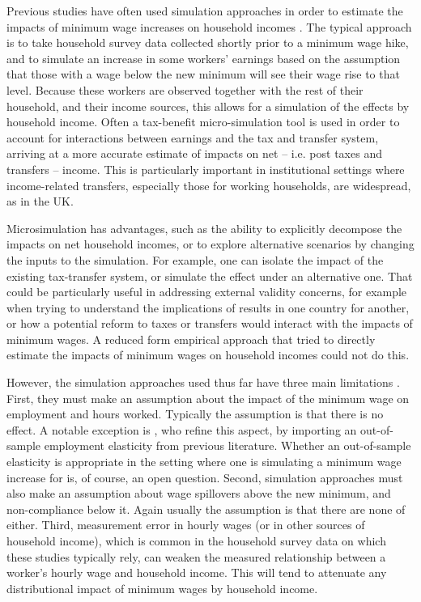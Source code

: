 Previous studies have often used simulation approaches in order to estimate the impacts of minimum wage increases on household incomes \citep{Brewer2017,Sabia2010}. The typical approach is to take household survey data collected shortly prior to a minimum wage hike, and to simulate an increase in some workers' earnings based on the assumption that those with a wage below the new minimum will see their wage rise to that level. Because these workers are observed together with the rest of their household, and their income sources, this allows for a simulation of the effects by household income. Often a tax-benefit micro-simulation tool is used in order to account for interactions between earnings and the tax and transfer system, arriving at a more accurate estimate of impacts on net -- i.e. post taxes and transfers -- income. This is particularly important in institutional settings where income-related transfers, especially those for working households, are widespread, as in the UK.

Microsimulation has advantages, such as the ability to explicitly decompose the impacts on net household incomes, or to explore alternative scenarios by changing the inputs to the simulation. For example, one can isolate the impact of the existing tax-transfer system, or simulate the effect under an alternative one. That could be particularly useful in addressing external validity concerns, for example when trying to understand the implications of results in one country for another, or how a potential reform to taxes or transfers would interact with the impacts of minimum wages. A reduced form empirical approach that tried to directly estimate the impacts of minimum wages on household incomes could not do this.

However, the simulation approaches used thus far have three main limitations \citep{Dube2019}. First, they must make an assumption about the impact of the minimum wage on employment and hours worked. Typically the assumption is that there is no effect. A notable exception is \cite{Sabia2010}, who refine this aspect, by importing an out-of-sample employment elasticity from previous literature. Whether an out-of-sample elasticity is appropriate in the setting where one is simulating a minimum wage increase for is, of course, an open question. Second, simulation approaches must also make an assumption about wage spillovers above the new minimum, and non-compliance below it. Again usually the assumption is that there are none of either. Third, measurement error in hourly wages (or in other sources of household income), which is common in the household survey data on which these studies typically rely, can weaken the measured relationship between a worker's hourly wage and household income. This will tend to attenuate any distributional impact of minimum wages by household income.

